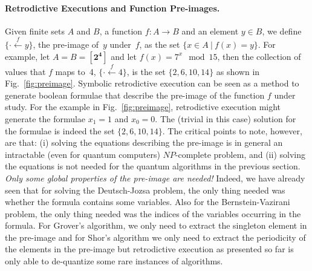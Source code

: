 \documentclass{article}
\newcommand{\preim}[2]{\{\cdot\stackrel{#1}{\longleftarrow}{#2}\}}
\newcommand{\finset}[1]{[\mathbf{#1}]}
\newcommand{\red}[1]{{\color{red}{#1}}}
\newcommand{\todo}[1]{\fbox{\begin{minipage}{40em}{\red{#1}}\end{minipage}}}
\begin{document}
\begin{refsection}
\paragraph*{Retrodictive Executions and Function Pre-images.}
Given finite sets $A$ and $B$, a function $f : A \rightarrow B$ and an
element $y \in B$, we define $\preim{f}{y}$, the pre-image of~$y$
under~$f$, as the set $\{ x \in A ~|~ f(x) = y \}$. For example, let
$A = B = \finset{2^4}$ and let $f(x) = 7^x \mod 15$, then the
collection of values that $f$ maps to~4, $\preim{f}{4}$, is the set
$\{ 2, 6, 10, 14 \}$ as shown in Fig.~\ref{fig:preimage}. Symbolic
retrodictive execution can be seen as a method to generate boolean
formulae that describe the pre-image of the function $f$ under
study. For the example in Fig.~\ref{fig:preimage}, retrodictive
execution might generate the formulae $x_1=1$ and $x_0=0$. The
(trivial in this case) solution for the formulae is indeed the set $\{
2, 6, 10, 14 \}$. The critical points to note, however, are that: (i)
solving the equations describing the pre-image is in general an
intractable (even for quantum computers) $\mathit{NP}$-complete
problem, and (ii) solving the equations is not needed for the quantum
algorithms in the previous section. \emph{Only some global properties
  of the pre-image are needed!} Indeed, we have already seen that for
solving the Deutsch-Jozsa problem, the only thing needed was whether
the formula contains some variables. Also for the Bernstein-Vazirani
problem, the only thing needed was the indices of the variables
occurring in the formula. For Grover's algorithm, we only need to
extract the singleton element in the pre-image and for Shor's
algorithm we only need to extract the periodicity of the elements in
the pre-image but retrodictive execution as presented so far is only
able to de-quantize some rare instances of algorithms.

\todo{
do communication protocols too ?

extensional vs intensional reasoning about functions

graph state: H,H,CZ
00   00
01   01
10   10
11 -11

check if H commutes with x and cx and ccx
so we only need H at beginning and end

insight: QFT insensitive to
0+2+4... vs 1+3+5...
so insensitive to where lsb is 0/1
so we only need to know if a variable is constant or varying 
fourier transform classical efficient in some cases

Kochen-Specker; interactive QM; observer free will; choice backtracks

}
\end{refsection}
\end{document}
